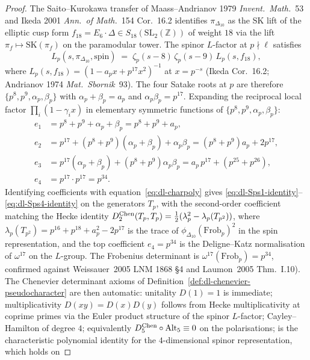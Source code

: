 \begin{proof}
The Saito--Kurokawa transfer of Maass--Andrianov 1979 \emph{Invent.\
Math.}\ 53 and Ikeda 2001 \emph{Ann.\ of Math.}\ 154 Cor.~16.2
identifies $\pi_{\Delta_{10}}$ as the SK lift of the elliptic cusp form
$f_{18}=E_6\cdot\Delta\in S_{18}(\mathrm{SL}_2(\mathbb{Z}))$ of weight
$18$ via the lift $\pi_f\mapsto\mathrm{SK}(\pi_f)$ on the paramodular
tower. The spinor $L$-factor at $p\nmid\ell$ satisfies
\[
 L_p(s,\pi_{\Delta_{10}},\mathrm{spin})
 \;=\;\zeta_p(s-8)\,\zeta_p(s-9)\,L_p(s,f_{18}),
\]
where $L_p(s,f_{18})=(1-a_p x + p^{17}x^2)^{-1}$ at $x=p^{-s}$ (Ikeda
Cor.~16.2; Andrianov 1974 \emph{Mat.\ Sbornik}\ 93). The four Satake
roots at $p$ are therefore
$\{p^8, p^9, \alpha_p, \beta_p\}$ with $\alpha_p+\beta_p = a_p$ and
$\alpha_p\beta_p = p^{17}$. Expanding the reciprocal local factor
$\prod_i(1-\gamma_i x)$ in elementary symmetric functions of
$\{p^8,p^9,\alpha_p,\beta_p\}$:
\begin{align*}
 e_1 &= p^8 + p^9 + \alpha_p + \beta_p = p^8 + p^9 + a_p,\\
 e_2 &= p^{17} + (p^8+p^9)(\alpha_p+\beta_p) + \alpha_p\beta_p
 = (p^8+p^9)a_p + 2p^{17},\\
 e_3 &= p^{17}(\alpha_p+\beta_p) + (p^8+p^9)\alpha_p\beta_p
 = a_p\,p^{17} + (p^{25}+p^{26}),\\
 e_4 &= p^{17}\cdot p^{17} = p^{34}.
\end{align*}
Identifying coefficients with equation~\eqref{eq:dl-charpoly}
gives \eqref{eq:dl-Sps1-identity}--\eqref{eq:dl-Sps4-identity}
on the generators $T_p$, with the second-order coefficient matching
the Hecke identity $D^{\mathrm{Chen}}_2(T_p,T_p) = \tfrac{1}{2}(\lambda_p^2 -
\lambda_p(T_{p^2}))$, where
$\lambda_p(T_{p^2})=p^{16}+p^{18}+a_p^2-2p^{17}$ is the trace of
$\phi_{\Delta_{10}}(\mathrm{Frob}_p)^2$ in the spin representation,
and the top coefficient $e_4=p^{34}$ is the Deligne--Katz
normalisation of $\omega^{17}$ on the $L$-group. The Frobenius
determinant is $\omega^{17}(\mathrm{Frob}_p)=p^{34}$, confirmed against
Weissauer~2005 LNM 1868 \S4 and Laumon~2005 Thm.~I.10). The Chenevier
determinant axioms of
Definition~\ref{def:dl-chenevier-pseudocharacter} are then
automatic: unitality $D(1)=1$ is immediate;
multiplicativity $D(xy)=D(x)D(y)$ follows from Hecke multiplicativity at
coprime primes via the Euler product structure of the spinor $L$-factor;
Cayley--Hamilton of degree $4$; equivalently $D^{\mathrm{Chen}}_5\circ\mathrm{Alt}_5
\equiv 0$ on the polarisations; is the characteristic polynomial
identity for the $4$-dimensional spinor representation, which holds on

\end{proof}
